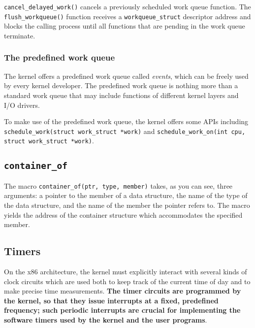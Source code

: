\documentclass[10pt,a4paper]{article}
\begin{document}
\texttt{cancel\_delayed\_work()} cancels a previously scheduled work queue function.
The \texttt{flush\_workqueue()} function receives a \texttt{workqueue\_struct} descriptor address and blocks the calling process until all functions that are pending in the work queue terminate. 


\subsubsection{The predefined work queue} 

The kernel offers a predefined work queue called \textit{events}, which can be freely used by every kernel developer. The predefined work queue is nothing more than a standard work queue that may include functions of different kernel layers and I/O drivers.

To make use of the predefined work queue, the kernel offers some APIs including \texttt{schedule\_work(struct work\_struct *work)} and \texttt{schedule\_work\_on(int cpu, struct work\_struct *work)}.

\subsection{\texttt{container\_of}}

The macro \texttt{container\_of(ptr, type, member)} takes, as you can see, three arguments: a pointer to the member of a data structure, the name of the type of the data structure, and the name of the member the pointer refers to. The macro yields the address of the container structure which accommodates the specified member.

\subsection{Timers}

On the x86 architecture, the kernel must explicitly interact with several kinds of clock circuits which are used both to keep track of the current time of day and to make precise time measurements. \textbf{The timer circuits are programmed by the kernel, so that they issue interrupts at a fixed, predefined frequency; such periodic interrupts are crucial for implementing the software timers used by the kernel and the user programs}. 
\end{document}
